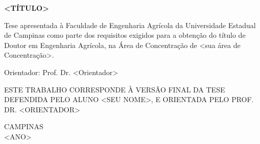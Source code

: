 \vspace*{2.0cm}

\begin{center}
	{\sc \Large  \bf <TÍTULO>}
\end{center}

\vspace*{2.0cm}

\begin{flushright}
    \begin{minipage}{9.0cm}
        Tese apresentada à Faculdade de Engenharia Agrícola da Universidade Estadual de Campinas como  parte dos
        requisitos exigidos para a obtenção do título de Doutor em Engenharia Agrícola, na Área de
        Concentração de <sua área de Concentração>.
    \end{minipage}
\end{flushright}

\vspace*{2.0cm}

\begin{flushleft}
	{Orientador: Prof. Dr. <Orientador>}
\end{flushleft}

\vspace*{2.0cm}

\begin{flushleft}
	\begin{minipage}{10.0cm}
		ESTE TRABALHO CORRESPONDE À VERSÃO FINAL DA TESE DEFENDIDA PELO ALUNO
		<SEU NOME>, E ORIENTADA PELO PROF. DR. <ORIENTADOR>
	\end{minipage}
\end{flushleft}

\null \vfill

\begin{center}
	CAMPINAS\\<ANO>
\end{center}

\newpage
\thispagestyle{empty}